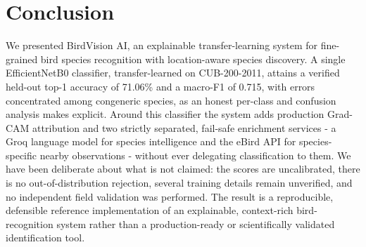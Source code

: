 \documentclass[conference]{IEEEtran}
\begin{document}
\section{Conclusion}
We presented BirdVision AI, an explainable transfer-learning system for fine-grained bird species recognition with location-aware species discovery. A single EfficientNetB0 classifier, transfer-learned on CUB-200-2011, attains a verified held-out top-1 accuracy of 71.06\% and a macro-F1 of 0.715, with errors concentrated among congeneric species, as an honest per-class and confusion analysis makes explicit. Around this classifier the system adds production Grad-CAM attribution and two strictly separated, fail-safe enrichment services - a Groq language model for species intelligence and the eBird API for species-specific nearby observations - without ever delegating classification to them. We have been deliberate about what is not claimed: the scores are uncalibrated, there is no out-of-distribution rejection, several training details remain unverified, and no independent field validation was performed. The result is a reproducible, defensible reference implementation of an explainable, context-rich bird-recognition system rather than a production-ready or scientifically validated identification tool.
\end{document}
